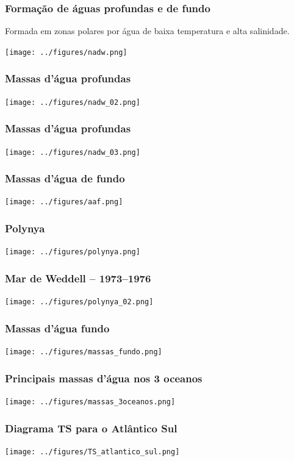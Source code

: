 \begin{frame}
\frametitle{Formação de águas profundas e de fundo}
{\small
\begin{block}{}
  Formada em zonas polares por água de baixa temperatura e alta salinidade.
\end{block}
}
  \begin{center}
    \texttt{[image: ../figures/nadw.png]}
  \end{center}
\end{frame}


\begin{frame}
\frametitle{Massas d'água profundas}
  \begin{center}
    \texttt{[image: ../figures/nadw\_02.png]}
  \end{center}
\end{frame}


\begin{frame}
\frametitle{Massas d'água profundas}
  \begin{center}
    \texttt{[image: ../figures/nadw\_03.png]}
  \end{center}
\end{frame}


\begin{frame}
\frametitle{Massas d'água de fundo}
  \begin{center}
    \texttt{[image: ../figures/aaf.png]}
  \end{center}
\end{frame}


\begin{frame}
\frametitle{Polynya}
  \begin{center}
    \texttt{[image: ../figures/polynya.png]}
  \end{center}
\end{frame}


\begin{frame}
\frametitle{Mar de Weddell -- 1973--1976}
  \begin{center}
    \texttt{[image: ../figures/polynya\_02.png]}
  \end{center}
\end{frame}


\begin{frame}
\frametitle{Massas d'água fundo}
  \begin{center}
    \texttt{[image: ../figures/massas\_fundo.png]}
  \end{center}
\end{frame}


\begin{frame}
\frametitle{Principais massas d'água nos 3 oceanos}
  \begin{center}
    \texttt{[image: ../figures/massas\_3oceanos.png]}
  \end{center}
\end{frame}


\begin{frame}
\frametitle{Diagrama TS para o Atlântico Sul}
  \begin{center}
    \texttt{[image: ../figures/TS\_atlantico\_sul.png]}
  \end{center}
\end{frame}



